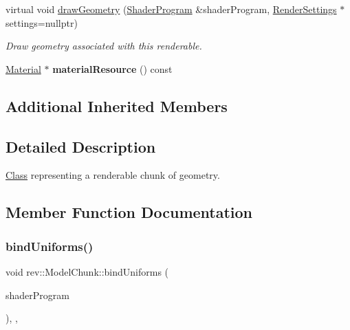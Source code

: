 \begin{Indent}
\begin{DoxyCompactItemize}
\mbox{\label{classrev_1_1_model_chunk_a4c326ccd56cbdb5d70efd369283f35bf}} 
virtual void \mbox{\hyperlink{classrev_1_1_model_chunk_a4c326ccd56cbdb5d70efd369283f35bf}{draw\+Geometry}} (\mbox{\hyperlink{classrev_1_1_shader_program}{Shader\+Program}} \&shader\+Program, \mbox{\hyperlink{classrev_1_1_render_settings}{Render\+Settings}} $\ast$settings=nullptr)
\begin{DoxyCompactList}\small\item\em Draw geometry associated with this renderable. \end{DoxyCompactList}\item 
\mbox{\label{classrev_1_1_model_chunk_acdfdcda5ddf9c7ca4e1df2be585d28dd}} 
\mbox{\hyperlink{classrev_1_1_material}{Material}} $\ast$ {\bfseries material\+Resource} () const
\end{DoxyCompactItemize}
\end{Indent}
\subsection*{Additional Inherited Members}


\subsection{Detailed Description}
\mbox{\hyperlink{struct_class}{Class}} representing a renderable chunk of geometry. 

\subsection{Member Function Documentation}
\mbox{\label{classrev_1_1_model_chunk_a57d245e346f01286e07f87fe3e409495}} 
\subsubsection{\texorpdfstring{bindUniforms()}{bindUniforms()}}
{\footnotesize\ttfamily void rev\+::\+Model\+Chunk\+::bind\+Uniforms (\begin{DoxyParamCaption}\item[{\mbox{\hyperlink{classrev_1_1_shader_program}{Shader\+Program}} \&}]{shader\+Program }\end{DoxyParamCaption})\hspace{0.3cm}{\ttfamily [override]}, {\ttfamily [protected]}, {\ttfamily [virtual]}}



